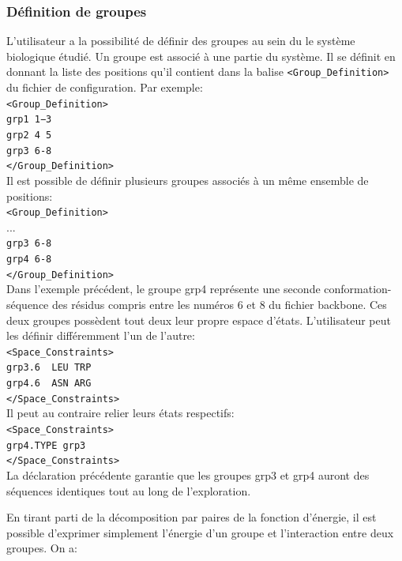 \subsubsection{Définition de groupes}
\label{sub:group}
L'utilisateur a la possibilité de définir des groupes au sein du le système biologique étudié. Un groupe est associé à une partie du système. Il se définit en donnant la liste des positions qu'il contient dans la balise \verb!<Group_Definition>! du fichier de configuration. Par exemple:\\
\verb!<Group_Definition>! \\
\verb!grp1 1−3! \\
\verb!grp2 4 5! \\
\verb!grp3 6-8! \\
\verb!</Group_Definition>! \\
Il est possible de définir plusieurs groupes associés à un même ensemble de positions:\\
\verb!<Group_Definition>! \\
... \\
\verb!grp3 6-8! \\
\verb!grp4 6-8! \\
\verb!</Group_Definition>! \\
Dans l'exemple précédent, le groupe grp4 représente une seconde conformation-séquence des résidus compris entre les numéros 6 et 8 du fichier backbone. Ces deux groupes possèdent tout deux leur propre espace d'états. L'utilisateur peut les définir différemment l'un de l'autre:\\
\verb!<Space_Constraints>! \\
\verb!grp3.6  LEU TRP! \\
\verb!grp4.6  ASN ARG!  \\
\verb!</Space_Constraints>! \\
Il peut au contraire relier leurs états respectifs:\\
\verb!<Space_Constraints>! \\
\verb!grp4.TYPE grp3! \\
\verb!</Space_Constraints>! \\
La déclaration précédente garantie que les groupes grp3 et grp4 auront des séquences identiques tout au long de l'exploration.

En tirant parti de la décomposition par paires de la fonction d'énergie, il est possible d'exprimer simplement l'énergie d'un groupe et l'interaction entre deux groupes. On a:

